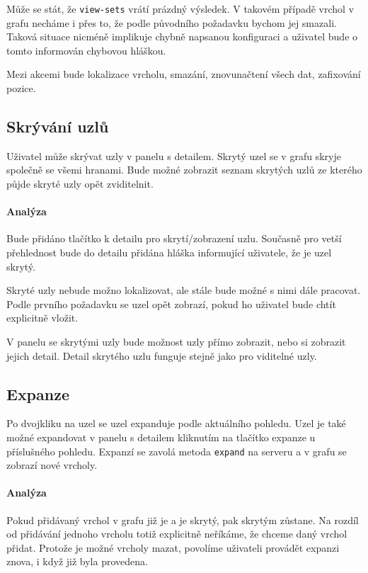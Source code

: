 Může se stát, že \texttt{view-sets} vrátí prázdný výsledek. V takovém případě vrchol v grafu necháme i přes to, že podle původního požadavku bychom jej smazali. Taková situace nicméně implikuje chybně napsanou konfiguraci a uživatel bude o tomto informován chybovou hláškou.

Mezi akcemi bude lokalizace vrcholu, smazání, znovunačtení všech dat, zafixování pozice.

\subsection*{Skrývání uzlů}
Uživatel může skrývat uzly v panelu s detailem. Skrytý uzel se v grafu skryje společně se všemi hranami. Bude možné zobrazit seznam skrytých uzlů ze kterého půjde skryté uzly opět zviditelnit.

\paragraph{Analýza} Bude přidáno tlačítko k detailu pro skrytí/zobrazení uzlu. Současně pro vetší přehlednost bude do detailu přidána hláška informující uživatele, že je uzel skrytý.

Skryté uzly nebude možno lokalizovat, ale stále bude možné s nimi dále pracovat. Podle prvního požadavku se uzel opět zobrazí, pokud ho uživatel bude chtít explicitně vložit.

V panelu se skrytými uzly bude možnost uzly přímo zobrazit, nebo si zobrazit jejich detail. Detail skrytého uzlu funguje stejně jako pro viditelné uzly.

\subsection*{Expanze}
Po dvojkliku na uzel se uzel expanduje podle aktuálního pohledu. Uzel je také možné expandovat v panelu s detailem kliknutím na tlačítko expanze u příslušného pohledu. Expanzí se zavolá metoda \texttt{expand} na serveru a v grafu se zobrazí nové vrcholy.

\paragraph{Analýza} Pokud přidávaný vrchol v grafu již je a je skrytý, pak skrytým zůstane. Na rozdíl od přidávání jednoho vrcholu totiž explicitně neříkáme, že chceme daný vrchol přidat. Protože je možné vrcholy mazat, povolíme uživateli provádět expanzi znova, i když již byla provedena.

